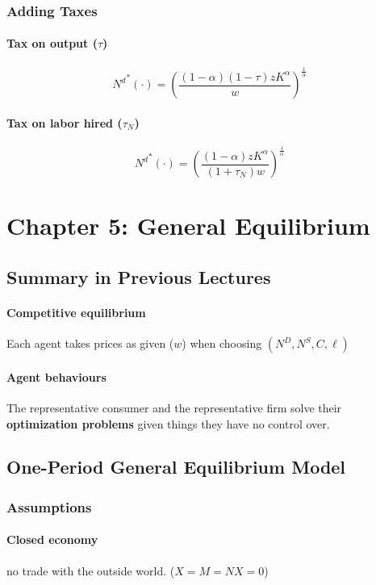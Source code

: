 \documentclass[11pt]{article}
\begin{document}
\subsubsection{Adding Taxes}
\paragraph{Tax on output ($\tau$)}
\begin{equation}
	{N^d}^*(\cdot) = (\frac{(1-\alpha)(1-\tau)z K^\alpha}{w})^{\frac{1}{\alpha}}
\end{equation}

\paragraph{Tax on labor hired ($\tau_N$)}
\begin{equation}
	{N^d}^*(\cdot) = (\frac{(1-\alpha)z K^\alpha}{(1 + \tau_N)w})^{\frac{1}{\alpha}}
\end{equation}

\section{Chapter 5: General Equilibrium}
\subsection{Summary in Previous Lectures}
\paragraph{Competitive equilibrium} Each agent takes prices as given ($w$) when choosing $(N^D, N^S, C, \ell)$
\paragraph{Agent behaviours} The representative consumer and the representative firm solve their \textbf{optimization problems} given things they have no control over.

\subsection{One-Period General Equilibrium Model}
\subsubsection{Assumptions}
\paragraph{Closed economy} no trade with the outside world. ($X=M=NX=0$)
\end{document}
